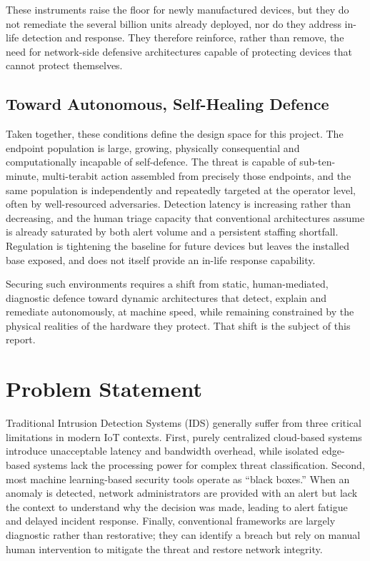 These instruments raise the floor for newly manufactured devices, but they do not remediate the several billion units already deployed, nor do they address in-life detection and response. They therefore reinforce, rather than remove, the need for network-side defensive architectures capable of protecting devices that cannot protect themselves.

\subsection{Toward Autonomous, Self-Healing Defence}

Taken together, these conditions define the design space for this project. The endpoint population is large, growing, physically consequential and computationally incapable of self-defence. The threat is capable of sub-ten-minute, multi-terabit action assembled from precisely those endpoints, and the same population is independently and repeatedly targeted at the operator level, often by well-resourced adversaries. Detection latency is increasing rather than decreasing, and the human triage capacity that conventional architectures assume is already saturated by both alert volume and a persistent staffing shortfall. Regulation is tightening the baseline for future devices but leaves the installed base exposed, and does not itself provide an in-life response capability.

Securing such environments requires a shift from static, human-mediated, diagnostic defence toward dynamic architectures that detect, explain and remediate autonomously, at machine speed, while remaining constrained by the physical realities of the hardware they protect. That shift is the subject of this report.

\section{Problem Statement}

Traditional Intrusion Detection Systems (IDS) generally suffer from three critical limitations in modern IoT contexts. First, purely centralized cloud-based systems introduce unacceptable latency and bandwidth overhead, while isolated edge-based systems lack the processing power for complex threat classification. Second, most machine learning-based security tools operate as ``black boxes.'' When an anomaly is detected, network administrators are provided with an alert but lack the context to understand why the decision was made, leading to alert fatigue and delayed incident response. Finally, conventional frameworks are largely diagnostic rather than restorative; they can identify a breach but rely on manual human intervention to mitigate the threat and restore network integrity.

